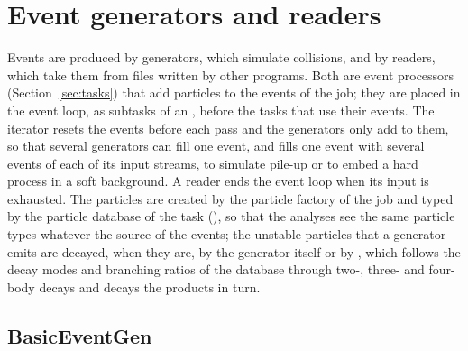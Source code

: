 \section{Event generators and readers}
\label{sec:generators}

Events are produced by generators, which simulate collisions, and by readers, which take them from files written by
other programs. Both are event processors (Section~\ref{sec:tasks}) that add particles to the events of the job; they
are placed in the event loop, as subtasks of an , before the tasks that use their events. The
iterator resets the events before each pass and the generators only add to them, so that several generators can fill
one event, and  fills one event with several events of each of its input streams, to simulate
pile-up or to embed a hard process in a soft background. A reader ends the event loop when its input is exhausted.
The particles are created by the particle factory of the job and typed by the particle database of the task
(), so that the analyses see the same particle types whatever the source of the events; the
unstable particles that a generator emits are decayed, when they are, by the generator itself or by
, which follows the decay modes and branching ratios of the database through two-, three-
and four-body decays and decays the products in turn.

\subsection{BasicEventGen}
\label{sec:basicgen}

